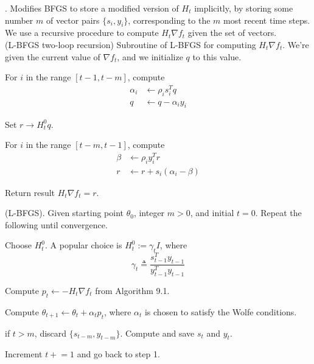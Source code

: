 \documentclass[11pt]{article}
\newcommand\myspace[1][]{\vspace{#1\bigskipamount}}
\newcommand\p{\Needspace{10\baselineskip} \noindent}
\begin{document}
\myspace{}
\p {}. Modifies BFGS to store a modified version of $H_t$ implicitly, by storing some number $m$ of vector pairs $\{s_i, y_i\}$, corresponding to the $m$ most recent time steps. We use a recursive procedure to compute $H_t \nabla f_t$ given the set of vectors. \\

 (L-BFGS two-loop recursion) Subroutine of L-BFGS for computing $ H_t \nabla f_t$. We're given the current value of $\nabla f_t$, and we initialize $q$ to this value. 
\begin{compactenum}
	\item For $i$ in the range $[t - 1, t - m]$, compute
	\begin{align}
		\alpha_i &\leftarrow \rho_i s_i^T q \\
		q &\leftarrow q - \alpha_i y_i
	\end{align}
	
	\item Set $r \rightarrow H_t^0 q$. 
	
	\item For $i$ in the range $[t - m, t - 1]$, compute
	\begin{align}
		\beta &\leftarrow \rho_i y_i^T r \\
		r &\leftarrow r + s_i(\alpha_i - \beta)
	\end{align}
	
	\item Return result $H_t \nabla f_t = r$. 
\end{compactenum}

 (L-BFGS). Given starting point $\theta_0$, integer $m > 0$, and initial $t = 0$. Repeat the following until convergence.
\begin{compactenum}
	\item Choose $H_t^0$. A popular choice is $H_t^0 := \gamma_t I$, where 
	$$
	\gamma_t \triangleq \frac{ s_{t - 1}^T y_{t - 1}  }{ y_{t - 1}^T y_{t - 1}  }
	$$
	
	\item Compute $p_t \leftarrow - H_t \nabla f_t$ from Algorithm 9.1. 
	
	\item Compute $\theta_{t + 1} \leftarrow \theta_t + \alpha_t p_t$, where $\alpha_t$ is chosen to satisfy the Wolfe conditions. 
	
	\item if $t > m$, discard $\{s_{t - m}, y_{t - m}  \}$. Compute and save $s_t$ and $y_t$. 
	
	\item Increment $t \mathrel{+}=  1$ and go back to step 1. 
\end{compactenum}
\end{document}
